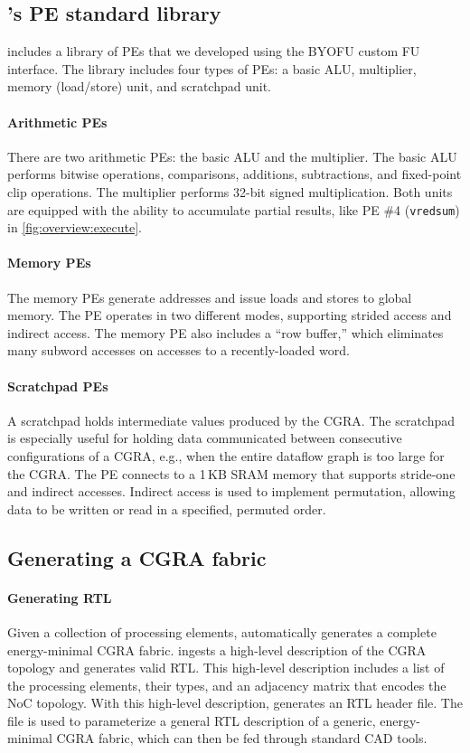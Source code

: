 \subsection{\snafuframe's PE standard library}
\snafuframe includes a library of PEs that we developed using the BYOFU custom
FU interface.  
% 
The library includes four types of PEs: a basic ALU, multiplier, memory 
(load/store) unit, and scratchpad unit.

\paragraph{Arithmetic PEs}
There are two arithmetic PEs: the basic ALU and the multiplier.
% 
The basic ALU performs bitwise operations, comparisons, additions, subtractions, and fixed-point clip operations.
% 
The multiplier performs 32-bit signed multiplication.
% 
Both units are equipped with the ability to accumulate partial results,
like PE \#4 ({\tt vredsum}) in \autoref{fig:overview:execute}. 

\paragraph{Memory PEs}
The memory PEs generate addresses and issue loads and stores to global memory.
% 
The PE operates in two different modes, supporting strided access and indirect access.
% 
The memory PE also includes a ``row buffer,'' which eliminates many subword accesses on accesses to a recently-loaded word.

\paragraph{Scratchpad PEs}
A scratchpad holds intermediate values produced by the CGRA. 
%
The scratchpad is especially useful for holding data communicated between
consecutive configurations of a CGRA, e.g., when the entire dataflow
graph is too large for the CGRA.
% 
The PE connects to a 1\,KB SRAM memory that supports stride-one and indirect
accesses.
% 
Indirect access is used to implement permutation, allowing data to be written
or read in a specified, permuted order.
%

\subsection{Generating a CGRA fabric}

\paragraph{Generating RTL}
Given a collection of processing elements, \snafuframe automatically generates a complete energy-minimal CGRA fabric.
% 
\snafuframe ingests a high-level description of the CGRA topology and generates valid RTL.
% 
This high-level description includes a list of the processing elements, their types, and an adjacency matrix that encodes the NoC topology.
%
With this high-level description, \snafuframe generates an RTL header file.
% 
The file is used to parameterize a general RTL description of a generic, energy-minimal CGRA fabric,
which can then be fed through standard CAD tools.
% 

